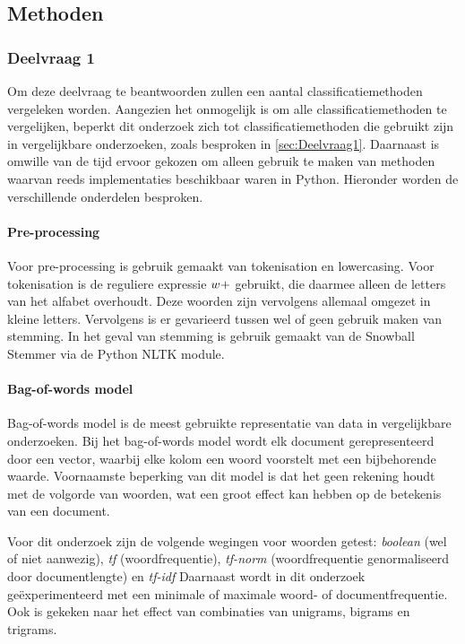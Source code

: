 \subsection{Methoden}


\subsubsection{Deelvraag 1}
Om deze deelvraag te beantwoorden zullen een aantal classificatiemethoden vergeleken worden. Aangezien het onmogelijk is om alle classificatiemethoden te vergelijken, beperkt dit onderzoek zich tot classificatiemethoden die gebruikt zijn in vergelijkbare onderzoeken, zoals besproken in \ref{sec:Deelvraag1}. Daarnaast is omwille van de tijd ervoor gekozen om alleen gebruik te maken van methoden waarvan reeds implementaties beschikbaar waren in Python. Hieronder worden de verschillende onderdelen besproken.

\paragraph{Pre-processing}
Voor pre-processing is gebruik gemaakt van tokenisation en lowercasing. Voor tokenisation is de reguliere expressie $\\w+$ gebruikt, die daarmee alleen de letters van het alfabet overhoudt. Deze woorden zijn vervolgens allemaal omgezet in kleine letters. Vervolgens is er gevarieerd tussen wel of geen gebruik maken van stemming. In het geval van stemming is gebruik gemaakt van de Snowball Stemmer via de Python NLTK module.

\paragraph{Bag-of-words model}
Bag-of-words model is de meest gebruikte representatie van data in vergelijkbare onderzoeken. Bij het bag-of-words model wordt elk document gerepresenteerd door een vector, waarbij elke kolom een woord voorstelt met een bijbehorende waarde. Voornaamste beperking van dit model is dat het geen rekening houdt met de volgorde van woorden, wat een groot effect kan hebben op de betekenis van een document.\par
Voor dit onderzoek zijn de volgende wegingen voor woorden getest: \textit{boolean} (wel of niet aanwezig), \textit{tf} (woordfrequentie), \textit{tf-norm} (woordfrequentie genormaliseerd door documentlengte) en \textit{tf-idf}
Daarnaast wordt in dit onderzoek geëxperimenteerd met een minimale of maximale woord- of documentfrequentie. Ook is gekeken naar het effect van combinaties van unigrams, bigrams en trigrams.\par

